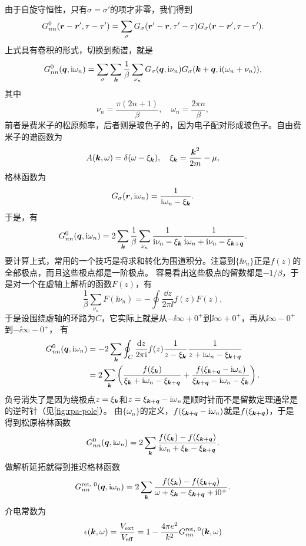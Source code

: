 由于自旋守恒性，只有$\sigma = \sigma'$的项才非零，我们得到
\[
    G_{nn}^\text{0}(\vb*{r}-\vb*{r}', \tau-\tau') = \sum_\sigma G_\sigma(\vb*{r}' - \vb*{r}, \tau' - \tau) G_\sigma(\vb*{r} - \vb*{r}', \tau - \tau').
\]
上式具有卷积的形式，切换到频谱，就是
\[
    G_{nn}^\text{0}(\vb*{q}, \mathrm{i} \omega_n) = \sum_{\sigma} \sum_{\vb*{k}} \frac{1}{\beta} \sum_{\nu_n} G_\sigma(\vb*{q}, \mathrm{i} \nu_n) G_\sigma(\vb*{k} + \vb*{q}, \mathrm{i} (\omega_n + \nu_n)),
\]
其中
\[
    \nu_n = \frac{\pi(2n+1)}{\beta}, \quad \omega_n = \frac{2\pi n}{\beta},
\]
前者是费米子的松原频率，后者则是玻色子的，因为电子配对形成玻色子。自由费米子的谱函数为
\[
    A(\vb*{k}, \omega) = \delta(\omega - \xi_{\vb*{k}}), \quad \xi_{\vb*{k}} = \frac{\vb*{k}^2}{2m} - \mu,
\]
格林函数为
\[
    G_\sigma(\vb*{r}, \mathrm{i} \omega_n) = \frac{1}{\mathrm{i} \omega_n - \xi_{\vb*{k}}}.
\]
于是，有
\[
    G_{nn}^\text{0}(\vb*{q}, \mathrm{i} \omega_n) = 2 \sum_{\vb*{k}} \frac{1}{\beta} \sum_{\nu_n} \frac{1}{\mathrm{i} \nu_n - \xi_{\vb*{k}}} \frac{1}{\mathrm{i} \omega_n + \mathrm{i} \nu_n - \xi_{\vb*{k}+\vb*{q}}}.
\]
要计算上式，常用的一个技巧是将求和转化为围道积分。注意到$\{\ii \nu_n\}$正是$f(z)$的全部极点，而且这些极点都是一阶极点。
容易看出这些极点的留数都是$-1/\beta$，于是对一个在虚轴上解析的函数$F(z)$，有
\[
    \frac{1}{\beta} \sum_{\nu_n} F(\ii \nu_n) = - \oint \frac{\dd{z}}{2\pi \ii} f(z) F(z),
\]
于是设围绕虚轴的环路为$C$，它实际上就是从$-\ii \infty + 0^+$到$\ii \infty + 0^+$，再从$\ii \infty - 0^+$到$-\ii \infty - 0^+$，
有
\[
    \begin{aligned}
        G_{nn}^\text{0}(\vb*{q}, \mathrm{i} \omega_n) &= - 2 \sum_{\vb*{k}} \oint_C \frac{\dd{z}}{2\pi \mathrm{i}} f(z) \frac{1}{z - \xi_{\vb*{k}}} \frac{1}{z +  \mathrm{i} \omega_n - \xi_{\vb*{k}+\vb*{q}}} \\
        &= 2 \sum_{\vb*{k}} \left( \frac{f(\xi_{\vb*{k}})}{\xi_{\vb*{k}} + \mathrm{i} \omega_n - \xi_{\vb*{k} + \vb*{q}}} + \frac{f(\xi_{\vb*{k} + \vb*{q}} - \mathrm{i} \omega_n)}{\xi_{\vb*{k} + \vb*{q}} - \mathrm{i} \omega_n - \xi_{\vb*{k}}} \right).
    \end{aligned}
\]
负号消失了是因为绕极点$z=\xi_{\vb*{k}}$和$z = \xi_{\vb*{k} + \vb*{q}} - \mathrm{i} \omega_n$是顺时针而不是留数定理通常是的逆时针（见\autoref{fig:rpa-pole}）。
由$\{\omega_n\}$的定义，$f(\xi_{\vb*{k} + \vb*{q}} - \mathrm{i} \omega_n)$就是$f(\xi_{\vb*{k} + \vb*{q}})$，于是得到松原格林函数
\begin{equation}
    G_{nn}^\text{0}(\vb*{q}, \mathrm{i} \omega_n) = 2 \sum_{\vb*{k}} \frac{f(\xi_{\vb*{k}}) - f(\xi_{\vb*{k} + \vb*{q}})}{\mathrm{i} \omega_n + \xi_{\vb*{k}} - \xi_{\vb*{k} + \vb*{q}}}.
\end{equation}
做解析延拓就得到推迟格林函数
\begin{equation}
    G_{nn}^\text{ret, 0}(\vb*{q}, \mathrm{i} \omega_n) = 2 \sum_{\vb*{k}} \frac{f(\xi_{\vb*{k}}) - f(\xi_{\vb*{k} + \vb*{q}})}{\omega + \xi_{\vb*{k}} - \xi_{\vb*{k} + \vb*{q}} + \mathrm{i} 0^+}.
    \label{eq:ext-electron-retarded-green-function}
\end{equation}
介电常数为
\begin{equation}
    \epsilon(\vb*{k}, \omega) = \frac{V_\text{ext}}{V_\text{eff}} = 1 - \frac{4 \pi e^2}{k^2} G^\text{ret, 0}_{nn}(\vb*{k}, \omega)
\end{equation}

